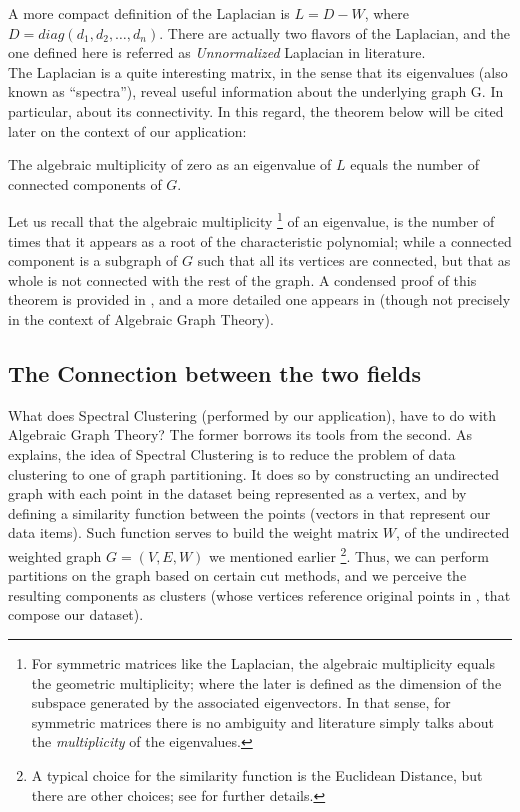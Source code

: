 A more compact definition of the Laplacian is $L = D - W$, where $D =
diag({d_1,d_2,\dots,d_n})$. There are actually two flavors of the
Laplacian, and the one defined here is referred as \emph{Unnormalized}
Laplacian in literature. \\

The Laplacian is a quite interesting matrix, in the sense that its
eigenvalues (also known as ``spectra''), reveal useful information about the
underlying graph G. In particular, about its connectivity. In this
regard, the theorem below will be cited later on the context of our
application: \\

\begin{theorem}
  \label{thm:speconn}
  The algebraic multiplicity of zero as an eigenvalue of $L$ equals
  the number of connected components of $G$.
\end{theorem}
\hfill

Let us recall that the algebraic multiplicity \footnote{For
  symmetric matrices like the Laplacian, the algebraic multiplicity
  equals the geometric multiplicity; where the later is defined as the
  dimension of the subspace generated by the associated
  eigenvectors. In that sense, for symmetric matrices there is 
  no ambiguity and literature simply talks about the \emph{multiplicity} of
  the eigenvalues.} of an eigenvalue, is the
number of times that it appears as a root of the characteristic
polynomial; while a connected component is a subgraph of
$G$ such that all its vertices are connected, but that as whole is not
connected with the rest of the graph. 
A condensed proof of this theorem is provided in
\cite{brouwer12}, and a more detailed one appears in \cite{luxburg07}
(though not precisely in the context of Algebraic Graph Theory). \\

\subsection{The Connection between the two fields}

What does Spectral Clustering (performed by our application), have to
do with Algebraic Graph Theory? The former borrows its tools from the
second. As \cite{jia14} explains, the idea of Spectral Clustering is
to reduce the problem of data clustering to one of graph
partitioning. It does so by constructing an undirected graph with each
point in the dataset being represented as a vertex, and by defining a
similarity function 
between the points (vectors in  that represent our data items). Such
function serves to build the weight matrix $W$, of the undirected weighted graph
$G = (V,E,W)$ we mentioned earlier \footnote{A typical choice
  for the similarity function is the Euclidean Distance, but there are
  other choices; see \cite{luxburg07} for further
  details.}. Thus, we can perform partitions on the graph
based on certain cut methods, and we perceive the resulting components as
clusters (whose vertices reference original points in , that
compose our dataset). \\

